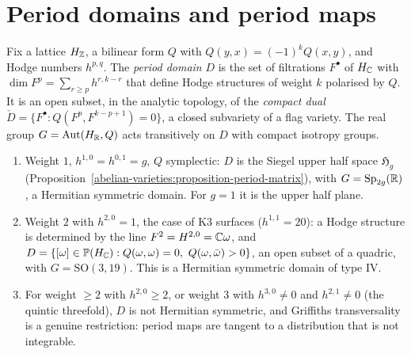 \section{Period domains and period maps}\label{vhs:section-period-domains}

\begin{definition}\label{vhs:definition-period-domain}
Fix a lattice $H_{\mathbb{Z}}$, a bilinear form $Q$ with $Q(y, x) = (-1)^kQ(x, y)$, and Hodge numbers $h^{p,q}$. The \emph{period domain} $D$ is the set of filtrations $F^\bullet$ of $H_{\mathbb{C}}$ with
$\dim F^p = \sum_{r \geq p}h^{r,k-r}$ that define Hodge structures of weight $k$ polarised by $Q$. It is an open subset, in the analytic topology, of the \emph{compact dual}
$\check D = \{F^\bullet : Q(F^p, F^{k-p+1}) = 0\}$, a closed subvariety of a flag variety. The real group $G = \mathrm{Aut}(H_{\mathbb{R}}, Q)$ acts transitively on $D$ with compact isotropy groups.
\end{definition}

\begin{example}\label{vhs:example-period-domains}
\begin{enumerate}
\item Weight $1$, $h^{1,0} = h^{0,1} = g$, $Q$ symplectic: $D$ is the Siegel upper half space $\mathfrak{H}_g$ (Proposition~\ref{abelian-varieties:proposition-period-matrix}), with
$G = \mathrm{Sp}_{2g}(\mathbb{R})$, a Hermitian symmetric domain. For $g = 1$ it is the upper half plane.
\item Weight $2$ with $h^{2,0} = 1$, the case of K3 surfaces ($h^{1,1} = 20$): a Hodge structure is determined by the line $F^2 = H^{2,0} = \mathbb{C}\omega$, and $D = \{[\omega] \in \mathbb{P}(H_{\mathbb{C}}) : Q(\omega, \omega) = 0,\ Q(\omega, \bar\omega) > 0\}$,
an open subset of a quadric, with $G = \mathrm{SO}(3, 19)$. This is a Hermitian symmetric domain of type IV.
\item For weight $\geq 2$ with $h^{2,0} \geq 2$, or weight $3$ with $h^{3,0} \neq 0$ and $h^{2,1} \neq 0$ (the quintic threefold), $D$ is not Hermitian symmetric, and Griffiths transversality is a
genuine restriction: period maps are tangent to a distribution that is not integrable.
\end{enumerate}
\end{example}

